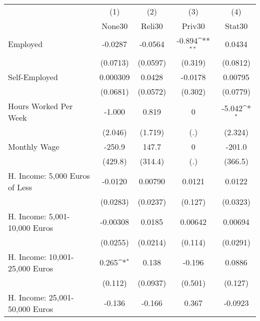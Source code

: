 {
\def\sym#1{\ifmmode^{#1}\else\(^{#1}\)\fi}
\begin{tabular}{l*{4}{c}}
\hline\hline
            &\multicolumn{1}{c}{(1)}&\multicolumn{1}{c}{(2)}&\multicolumn{1}{c}{(3)}&\multicolumn{1}{c}{(4)}\\
            &\multicolumn{1}{c}{None30}&\multicolumn{1}{c}{Reli30}&\multicolumn{1}{c}{Priv30}&\multicolumn{1}{c}{Stat30}\\
\hline
Employed    &     -0.0287         &     -0.0564         &      -0.894\sym{**} &      0.0434         \\
            &    (0.0713)         &    (0.0597)         &     (0.319)         &    (0.0812)         \\
[1em]
Self-Employed&    0.000309         &      0.0428         &     -0.0178         &     0.00795         \\
            &    (0.0681)         &    (0.0572)         &     (0.302)         &    (0.0779)         \\
[1em]
Hours Worked Per Week&      -1.000         &       0.819         &           0         &      -5.042\sym{*}  \\
            &     (2.046)         &     (1.719)         &         (.)         &     (2.324)         \\
[1em]
Monthly Wage&      -250.9         &       147.7         &           0         &      -201.0         \\
            &     (429.8)         &     (314.4)         &         (.)         &     (366.5)         \\
[1em]
H. Income: 5,000 Euros of Less&     -0.0120         &     0.00790         &      0.0121         &      0.0122         \\
            &    (0.0283)         &    (0.0237)         &     (0.127)         &    (0.0323)         \\
[1em]
H. Income: 5,001-10,000 Euros&    -0.00308         &      0.0185         &     0.00642         &     0.00694         \\
            &    (0.0255)         &    (0.0214)         &     (0.114)         &    (0.0291)         \\
[1em]
H. Income: 10,001-25,000 Euros&       0.265\sym{*}  &       0.138         &      -0.196         &      0.0886         \\
            &     (0.112)         &    (0.0937)         &     (0.501)         &     (0.127)         \\
[1em]
H. Income: 25,001-50,000 Euros&      -0.136         &      -0.166         &       0.367         &     -0.0923         \\

\end{tabular}}
